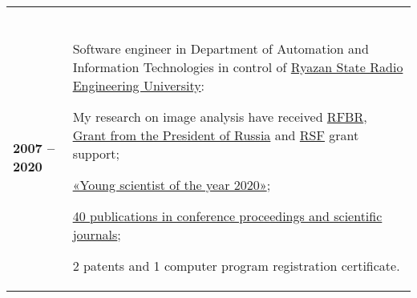 \documentclass[11pt]{article}
\renewenvironment{itemize}{
	\begin{list}{\labelitemi}{
			\setlength{\topsep}{0pt}
			\setlength{\partopsep}{0pt}
			\setlength{\parskip}{0pt}
			\setlength{\parsep}{0pt}
			\setlength{\itemsep}{0pt}
		}
	}{\end{list}}
\begin{document}
\begin{tabular} {l | p{}}
\begin{itemize}
		\end{itemize}\\
		\textbf{2007 -- 2020} & Software engineer in Department of Automation and Information Technologies in control of \href{http://www.rsreu.ru/en/}{Ryazan State Radio Engineering University}:
		\begin{itemize}
			\item My research on image analysis have received \href{https://www.rfbr.ru/project_search/350568/}{RFBR}, \href{https://grants.extech.ru/grants/res/winners.php?OZ=9&TZ=K&year=2016}{Grant from the President of Russia} and \href{http://rscf.ru/sites/default/files/docfiles/Winners_0029.pdf}{RSF} grant support;
			\item \href{https://ryazan.bezformata.com/listnews/aspiranti-rgrtu-pobediteli-konkursa/81548415/}{«Young scientist of the year 2020»};
			\item \hyperlink{AutorIDs}{40 publications in conference proceedings and scientific journals};
			\item 2 patents and 1 computer program registration certificate.
		\end{itemize}
		\vspace*{-\baselineskip} %
	\end{tabular}
	\vspace{0.9em}\\
\end{document}
